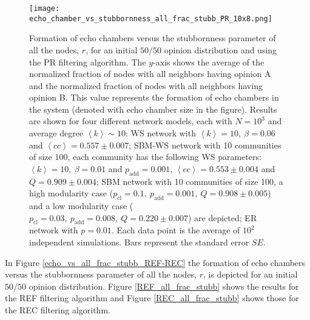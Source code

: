 \documentclass[11 pt , letterpaper , twoside , openright]{book}
\begin{document}
\begin{figure}[H]
	\texttt{[image: echo\_chamber\_vs\_stubbornness\_all\_frac\_stubb\_PR\_10x8.png]}
	\captionsetup{format=plain}
	\caption[Formation of echo chambers versus the stubbornness parameter of all the nodes, $r$, for the PR filtering algorithm and an initial $50/50$ opinion distribution.]{Formation of echo chambers versus the stubbornness parameter of all the nodes, $r$, for an initial $50/50$ opinion distribution and using the PR filtering algorithm. The $y$-axis shows the average of the normalized fraction of nodes with all neighbors having opinion A and the normalized fraction of nodes with all neighbors having opinion B. This value represents the formation of echo chambers in the system (denoted with echo chamber size in the figure). Results are shown for four different network models, each with $N=10^3$ and average degree $\left<k\right> \sim 10$: WS network with $\left<k\right> =10,\ \beta = 0.06$ and $\left<cc\right> = 0.557 \pm 0.007$; SBM-WS network with 10 communities of size 100, each community has the following WS parameters: $\left<k\right> = 10,\ \beta = 0.01$ and $p_{\text{add}} = 0.001$, $\left<cc\right> = 0.553 \pm 0.004$ and $Q = 0.909 \pm 0.004$; SBM network with 10 communities of size 100, a high modularity case ($p_{\text{cl}} = 0.1,\ p_{\text{add}} = 0.001,\ Q = 0.908 \pm 0.005$) and a low modularity case ($p_{\text{cl}} = 0.03,\ p_{\text{add}} = 0.008,\ Q = 0.220 \pm 0.007$) are depicted; ER network with $p= 0.01$. Each data point is the average of $10^2$ independent simulations. Bars represent the standard error $SE$.}
\label{echo_vs_all_frac_stubb_PR}
\end{figure}
\noindent
In Figure \ref{echo_vs_all_frac_stubb_REF-REC} the formation of echo chambers versus the stubbornness parameter of all the nodes, $r$, is depicted for an initial $50/50$ opinion distribution. Figure \ref{REF_all_frac_stubb} shows the results for the REF filtering algorithm and Figure \ref{REC_all_frac_stubb} shows those for the REC filtering algorithm.
\newpage
\end{document}
